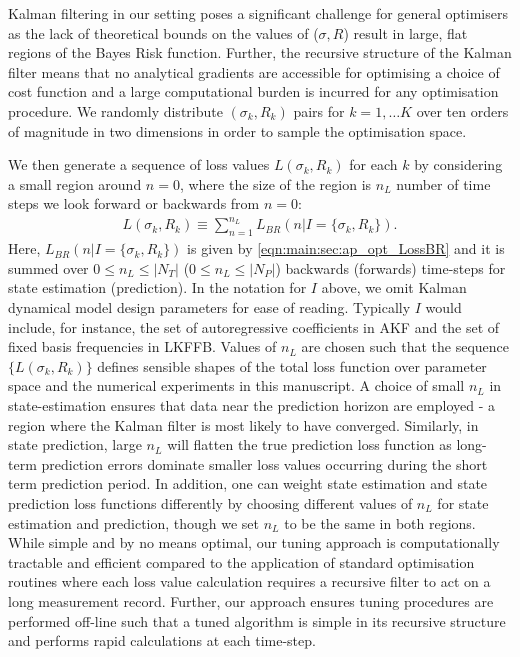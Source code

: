 Kalman filtering in our setting poses a significant challenge for general optimisers as the lack of theoretical bounds on the values of ($\sigma, R$) result in large, flat regions of the Bayes Risk function. Further, the recursive structure of the Kalman filter means that no analytical gradients are accessible for optimising a choice of cost function and a large computational burden is incurred for any optimisation procedure. We randomly distribute $(\sigma_{k}, R_{k})$ pairs for $k=1, \hdots K $ over ten orders of magnitude in two dimensions in order to sample the optimisation space.

We then generate a sequence of loss values $L(\sigma_k, R_k)$ for each $k$ by considering a small region around $n=0$, where the size of the region is $n_L$ number of time steps we look forward or backwards from $n=0$:
\begin{align}
L(\sigma_k, R_k) \equiv  \sum_{n=1}^{n_L} L_{BR}(n | I= \{\sigma_k, R_k \}) \label{eqn:main:risk:optriskvalue}.
\end{align}
Here, $L_{BR}(n | I= \{\sigma_k, R_k \})$ is given by \cref{eqn:main:sec:ap_opt_LossBR} and it is summed over $0\leq n_L\leq |N_{T}|$  ($0\leq n_L\leq |N_{P}|$) backwards (forwards) time-steps for state estimation (prediction). In the notation for $I$ above, we omit Kalman dynamical model design parameters for ease of reading.  Typically $I$ would include, for instance, the set of autoregressive coefficients in AKF and the set of fixed basis frequencies in LKFFB. Values of $n_L$ are chosen such that the sequence $\{L(\sigma_k, R_k) \}$ defines sensible shapes of the total loss function over parameter space and the numerical experiments in this manuscript. A choice of small $n_L$ in state-estimation ensures that data near the prediction horizon are employed - a region where the Kalman filter is most likely to have converged.  Similarly, in state prediction, large $n_L$ will flatten the true prediction loss function as long-term prediction errors dominate smaller loss values occurring during the short term prediction period. In addition, one can weight state estimation and state prediction loss functions differently by choosing different values of $n_L$ for state estimation and prediction, though we set $n_L$ to be the same in both regions. While simple and by no means optimal, our tuning approach is computationally tractable and efficient compared to the application of standard optimisation routines where each loss value calculation requires a recursive filter to act on a long measurement record. Further, our approach ensures tuning procedures are performed off-line such that a tuned algorithm is simple in its recursive structure and performs rapid calculations at each time-step.

